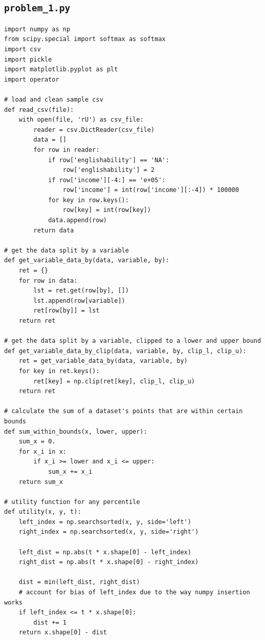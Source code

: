 \documentclass[12pt]{article}
\def\cl{\lstinline}
\begin{document}
\newpage

\begin{appendices}

\section{\cl{problem_1.py}}
\label{appendix:problem_1}

\begin{lstlisting}
import numpy as np
from scipy.special import softmax as softmax
import csv
import pickle
import matplotlib.pyplot as plt
import operator

# load and clean sample csv
def read_csv(file):
    with open(file, 'rU') as csv_file:
        reader = csv.DictReader(csv_file)
        data = []
        for row in reader:
            if row['englishability'] == 'NA':
                row['englishability'] = 2
            if row['income'][-4:] == 'e+05':
                row['income'] = int(row['income'][:-4]) * 100000
            for key in row.keys():
                row[key] = int(row[key])
            data.append(row)
        return data

# get the data split by a variable
def get_variable_data_by(data, variable, by):
    ret = {}
    for row in data:
        lst = ret.get(row[by], [])
        lst.append(row[variable])
        ret[row[by]] = lst
    return ret

# get the data split by a variable, clipped to a lower and upper bound
def get_variable_data_by_clip(data, variable, by, clip_l, clip_u):
    ret = get_variable_data_by(data, variable, by)
    for key in ret.keys():
        ret[key] = np.clip(ret[key], clip_l, clip_u)
    return ret

# calculate the sum of a dataset's points that are within certain bounds
def sum_within_bounds(x, lower, upper):
    sum_x = 0.
    for x_i in x:
        if x_i >= lower and x_i <= upper:
            sum_x += x_i
    return sum_x 

# utility function for any percentile
def utility(x, y, t):
    left_index = np.searchsorted(x, y, side='left')
    right_index = np.searchsorted(x, y, side='right')

    left_dist = np.abs(t * x.shape[0] - left_index)
    right_dist = np.abs(t * x.shape[0] - right_index)

    dist = min(left_dist, right_dist)
    # account for bias of left_index due to the way numpy insertion works
    if left_index <= t * x.shape[0]:
        dist += 1
    return x.shape[0] - dist


\end{lstlisting}
\end{appendices}
\end{document}
